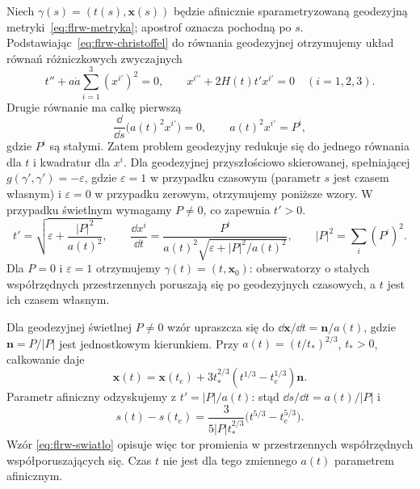 \begin{przyklad}
\label{prz:flrw-geodezyjne}
Niech $\gamma(s)=(t(s),\mathbf x(s))$ będzie afinicznie
sparametryzowaną geodezyjną metryki~\eqref{eq:flrw-metryka};
apostrof oznacza pochodną po $s$.
Podstawiając~\eqref{eq:flrw-christoffel} do równania geodezyjnej
otrzymujemy układ równań różniczkowych zwyczajnych
\begin{equation}\label{eq:flrw-ode-geodezyjnych}
 t''+a\dot a\sum_{i=1}^3(x^{i\prime})^2=0,\qquad
 x^{i\prime\prime}+2H(t)t'x^{i\prime}=0
 \quad(i=1,2,3).
\end{equation}
Drugie równanie ma całkę pierwszą
\begin{equation}\label{eq:flrw-momenty}
 \frac{\dd}{\dd s}\bigl(a(t)^2x^{i\prime}\bigr)=0,
 \qquad a(t)^2x^{i\prime}=P^i,
\end{equation}
gdzie $P^i$ są stałymi. Zatem problem geodezyjny
redukuje się do jednego równania dla $t$ i kwadratur dla $x^i$.
Dla geodezyjnej przyszłościowo skierowanej, spełniającej
$g(\gamma',\gamma')=-\varepsilon$,
gdzie $\varepsilon=1$ w przypadku czasowym (parametr $s$ jest
czasem własnym) i $\varepsilon=0$ w przypadku zerowym,
otrzymujemy poniższe wzory. W przypadku świetlnym
wymagamy $P\ne0$, co zapewnia $t'>0$.
\begin{equation}\label{eq:flrw-pierwsza-calka}
 t'=\sqrt{\varepsilon+\frac{|P|^2}{a(t)^2}},\qquad
 \frac{\dd x^i}{\dd t}
 =\frac{P^i}{a(t)^2\sqrt{\varepsilon+|P|^2/a(t)^2}},
 \qquad |P|^2=\sum_i(P^i)^2.
\end{equation}
Dla $P=0$ i $\varepsilon=1$ otrzymujemy
$\gamma(t)=(t,\mathbf x_0)$: obserwatorzy o stałych
współrzędnych przestrzennych poruszają się po geodezyjnych
czasowych, a $t$ jest ich czasem własnym.

Dla geodezyjnej świetlnej $P\ne0$ wzór upraszcza się do
$\dd\mathbf x/\dd t=\mathbf n/a(t)$,
gdzie $\mathbf n=P/|P|$ jest jednostkowym kierunkiem.
Przy $a(t)=(t/t_*)^{2/3}$, $t_*>0$, całkowanie daje
\begin{equation}\label{eq:flrw-swiatlo}
 \mathbf x(t)=\mathbf x(t_e)+
 3t_*^{2/3}(t^{1/3}-t_e^{1/3})\mathbf n.
\end{equation}
Parametr afiniczny odzyskujemy z $t'=|P|/a(t)$:
stąd $\dd s/\dd t=a(t)/|P|$ i
\[
 s(t)-s(t_e)=
 \frac{3}{5|P|t_*^{2/3}}
       \bigl(t^{5/3}-t_e^{5/3}\bigr).
\]
Wzór \eqref{eq:flrw-swiatlo} opisuje więc tor promienia
w przestrzennych współrzędnych współporuszających się.
Czas $t$ nie jest dla tego zmiennego $a(t)$ parametrem afinicznym.
\end{przyklad}

